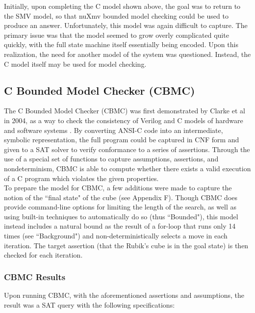 \documentclass{article}
\begin{document}
\noindent Initially, upon completing the C model shown above, the goal was to return to the SMV model, so that nuXmv bounded model checking could be used to produce an answer. Unfortunately, this model was again difficult to capture. The primary issue was that the model seemed to grow overly complicated quite quickly, with the full state machine itself essentially being encoded. Upon this realization, the need for another model of the system was questioned. Instead, the C model itself may be used for model checking.

\subsection {C Bounded Model Checker (CBMC)}

The C Bounded Model Checker (CBMC) was first demonstrated by Clarke et al in 2004, as a way to check the consistency of Verilog and C models of hardware and software systems \cite{clarke}. By converting ANSI-C code into an intermediate, symbolic representation, the full program could be captured in CNF form and given to a SAT solver to verify conformance to a series of assertions. Through the use of a special set of functions to capture assumptions, assertions, and nondeterminism, CBMC is able to compute whether there exists a valid execution of a C program which violates the given properties. \\

\noindent To prepare the model for CBMC, a few additions were made to capture the notion of the ``final state" of the cube (see Appendix F). Though CBMC does provide command-line options for limiting the length of the search, as well as using built-in techniques to automatically do so (thus ``Bounded"), this model instead includes a natural bound as the result of a for-loop that runs only 14 times (see ``Background") and non-deterministically selects a move in each iteration. The target assertion (that the Rubik's cube is in the goal state) is then checked for each iteration. 


\subsubsection {CBMC Results}

Upon running CBMC, with the aforementioned assertions and assumptions, the result was a SAT query with the following specifications:
\end{document}
